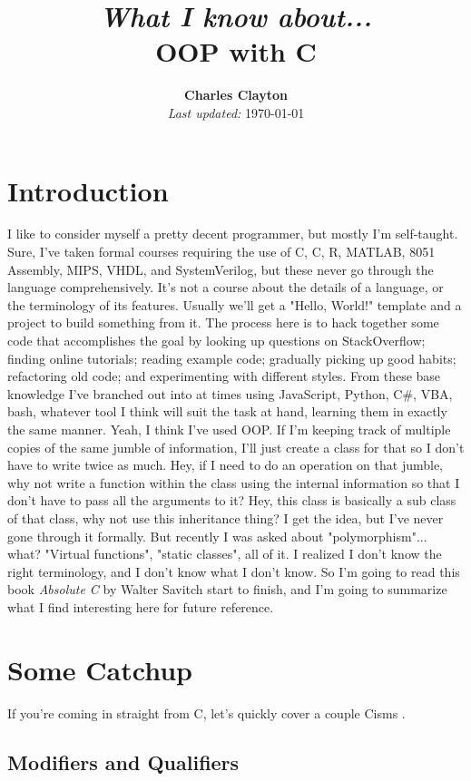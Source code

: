 \documentclass{IEEEtran}
\title{\small \textit{What I know about...} \\ \Huge OOP with C\nolinebreak\hspace{-.05em}\raisebox{.2ex}{\huge\bf +}\nolinebreak\hspace{-.10em}\raisebox{.2ex}{\huge\bf +}}
\author{\textbf{Charles Clayton} \\ \small \textit{Last updated:} \today}
\newcommand{\cpp}{C\nolinebreak\hspace{-.05em}\raisebox{.15ex}{\small\bf +}\nolinebreak\hspace{-.10em}\raisebox{.15ex}{\small\bf+\ }}
\begin{document}
\maketitle

\section{Introduction}

I like to consider myself a pretty decent programmer, but mostly I'm self-taught. Sure, I've taken formal courses requiring the use of C, \cpp, R, MATLAB, 8051 Assembly, MIPS, VHDL, and SystemVerilog, but these never go through the language comprehensively. It's not a course about the details of a language, or the terminology of its features. Usually we'll get a "Hello, World!" template and a project to build something from it. The process here is to hack together some code that accomplishes the goal by looking up questions on StackOverflow; finding online tutorials; reading example code; gradually picking up good habits; refactoring old code; and experimenting with different styles. From these base knowledge I've branched out into at times using JavaScript, Python, C\#, VBA, bash, whatever tool I think will suit the task at hand, learning them in exactly the same manner.  Yeah, I think I've used OOP. If I'm keeping track of multiple copies of the same jumble of information, I'll just create a class for that so I don't have to write twice as much. Hey, if I need to do an operation on that jumble, why not write a function within the class using the internal information so that I don't have to pass all the arguments to it? Hey, this class is basically a sub class of that class, why not use this inheritance thing? I get the idea, but I've never gone through it formally. But recently I was asked about "polymorphism"... what? "Virtual functions", "static classes", all of it. I realized I don't know the right terminology, and I don't know what I don't know. So I'm going to read this book \textit{Absolute \cpp} by Walter Savitch start to finish, and I'm going to summarize what I find interesting here for future reference.

\section{Some Catchup}

If you're coming in straight from C, let's quickly cover a couple \cpp isms .

\subsection{Modifiers and Qualifiers}
\end{document}
